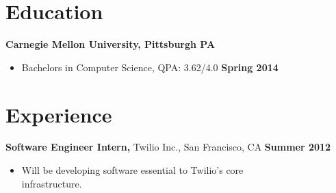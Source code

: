 \documentclass[sectioned]{dsyangres}
\begin{document}

\address{{\bf School Address} \\
  5032 Forbes Ave. SMC 4932 \\ Pittsburgh, PA 15289  \\
         }
\address{{\bf Home Address} \\
  5313 Betheny Circle \\
  Superior Township, MI 48198 \\
   }


\begin{resume}




\section{Education}

\textbf{Carnegie Mellon University, Pittsburgh PA}
  \begin{itemize}
    \item Bachelors in Computer Science, QPA: 3.62/4.0 \hfill \textbf{ Spring 2014}
  \end{itemize}


\section{Experience}

\textbf{Software Engineer Intern,}
  Twilio Inc., San Francisco, CA \hfill \textbf{Summer 2012}
  \begin{itemize} \itemsep -2pt
    \item Will be developing software essential to Twilio's core \\
      infrastructure.
  \end{itemize}


\end{resume}
\end{document}
